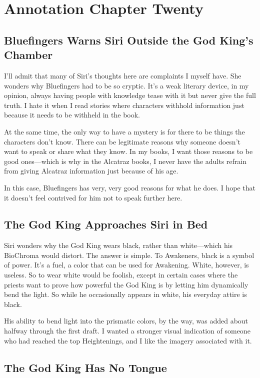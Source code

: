 \section{Annotation Chapter Twenty}

\subsection*{Bluefingers Warns Siri Outside the God King’s Chamber}

I’ll admit that many of Siri’s thoughts here are complaints I myself have. She wonders why Bluefingers had to be so cryptic. It’s a weak literary device, in my opinion, always having people with knowledge tease with it but never give the full truth. I hate it when I read stories where characters withhold information just because it needs to be withheld in the book.

At the same time, the only way to have a mystery is for there to be things the characters don’t know. There can be legitimate reasons why someone doesn’t want to speak or share what they know. In my books, I want those reasons to be good ones—which is why in the Alcatraz books, I never have the adults refrain from giving Alcatraz information just because of his age.

In this case, Bluefingers has very, very good reasons for what he does. I hope that it doesn’t feel contrived for him not to speak further here.

\subsection*{The God King Approaches Siri in Bed}

Siri wonders why the God King wears black, rather than white—which his BioChroma would distort. The answer is simple. To Awakeners, black is a symbol of power. It’s a fuel, a color that can be used for Awakening. White, however, is useless. So to wear white would be foolish, except in certain cases where the priests want to prove how powerful the God King is by letting him dynamically bend the light. So while he occasionally appears in white, his everyday attire is black.

His ability to bend light into the prismatic colors, by the way, was added about halfway through the first draft. I wanted a stronger visual indication of someone who had reached the top Heightenings, and I like the imagery associated with it.

\subsection*{The God King Has No Tongue}

